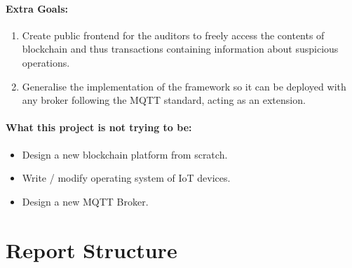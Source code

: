 \paragraph{Extra Goals:}
\begin{enumerate}
  \item Create public frontend for the auditors to freely access the contents of blockchain and thus transactions containing information about suspicious operations.
  \item Generalise the implementation of the framework so it can be deployed with any broker following the MQTT standard, acting as an extension.
\end{enumerate}

\paragraph{What this project is not trying to be:}
\begin{itemize}
  \item Design a new blockchain platform from scratch.
  \item Write / modify operating system of IoT devices.
  \item Design a new MQTT Broker.
\end{itemize}

\section{Report Structure}

